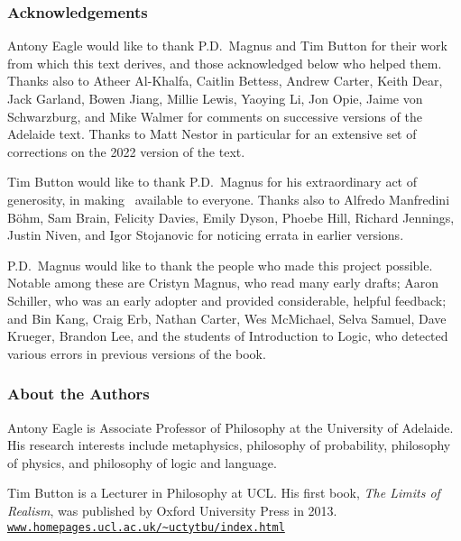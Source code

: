 \thispagestyle{empty}
\onecolumn



\subsubsection*{Acknowledgements}
Antony Eagle would like to thank P.D.\ Magnus and Tim Button for their work from which this text derives, and those acknowledged below who helped them. Thanks also to Atheer Al-Khalfa, Caitlin Bettess, Andrew Carter, Keith Dear, Jack Garland, Bowen Jiang, Millie Lewis, Yaoying Li, Jon Opie, Jaime von Schwarzburg, and Mike Walmer for comments on successive versions of the Adelaide text. Thanks to Matt Nestor in particular for an extensive set of corrections on the 2022 version of the text.\medskip

Tim Button would like to thank P.D.\ Magnus for his extraordinary act of generosity, in making \forallx\ available to everyone. Thanks also to Alfredo Manfredini Böhm, Sam Brain, Felicity Davies, Emily Dyson, Phoebe Hill, Richard Jennings, Justin Niven,  and Igor Stojanovic for noticing errata in earlier versions. \medskip

P.D.\ Magnus would like to thank the people who made this project possible. Notable among these are Cristyn Magnus, who read many early drafts; Aaron Schiller, who was an early adopter and provided considerable, helpful feedback; {and} Bin Kang, Craig Erb, Nathan Carter, Wes McMichael, Selva Samuel,  Dave Krueger, Brandon Lee, and the students of Introduction to Logic, who detected various errors in previous versions of the book. 

\subsubsection*{About the Authors}

Antony Eagle is Associate Professor of Philosophy at the University of Adelaide. His research interests include metaphysics, philosophy of probability, philosophy of physics, and philosophy of logic and language. 
\medskip


Tim Button is a Lecturer in Philosophy at UCL. His first book, \emph{The Limits of Realism}, was published by Oxford University Press in 2013. \href{http://www.homepages.ucl.ac.uk/~uctytbu/index.html}{\nolinkurl{www.homepages.ucl.ac.uk/~uctytbu/index.html}}
\medskip

